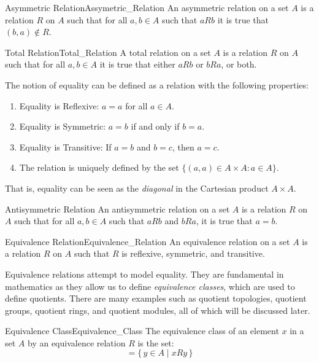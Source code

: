     \begin{fdefinition}{Asymmetric Relation}{Assymetric_Relation}
        An asymmetric relation on a set $A$ is a relation $R$
        on $A$ such that for all $a,b\in{A}$ such that $aRb$
        it is true that $(b,a)\notin{R}$.
    \end{fdefinition}
    \begin{fdefinition}{Total Relation}{Total_Relation}
        A total relation on a set $A$ is a relation $R$ on $A$ such
        that for all $a,b\in{A}$ it is true that either
        $aRb$ or $bRa$, or both.
    \end{fdefinition}
    The notion of equality can be defined as a relation
    with the following properties:
    \begin{enumerate}
        \item Equality is Reflexive: $a=a$ for all $a\in{A}$.
        \item Equality is Symmetric: $a=b$ if and only if $b=a$.
        \item Equality is Transitive: If $a=b$ and $b=c$, then $a=c$.
        \item The relation is uniquely defined by the set
              $\{(a,a)\in A\times A:a\in A\}$.
    \end{enumerate}
    That is, equality can be seen as the \textit{diagonal} in the
    Cartesian product $A\times{A}$.
    \begin{fdefinition}{Antisymmetric Relation}
        An antisymmetric relation on a set $A$ is a relation $R$ on $A$
        such that for all $a,b\in{A}$ such that $aRb$ and $bRa$, it
        is true that $a=b$.
    \end{fdefinition}
    \begin{fdefinition}{Equivalence Relation}{Equivalence_Relation}
        An equivalence relation on a set $A$ is a relation $R$ on $A$ such that
        $R$ is reflexive, symmetric, and transitive.
    \end{fdefinition}
    Equivalence relations attempt to model equality. They are fundamental in
    mathematics as they allow us to define \textit{equivalence classes}, which
    are used to define quotients. There are many examples such as quotient
    topologies, quotient groups, quotient rings, and quotient modules, all of
    which will be discussed later.
    \begin{fdefinition}{Equivalence Class}{Equivalence_Class}
        The equivalence class of an element $x$ in a set $A$ by an
        equivalence relation $R$ is the set:
        \begin{equation*}
            [x]=\{\,y\in{A}\;|\;xRy\,\}
        \end{equation*}
    \end{fdefinition}
